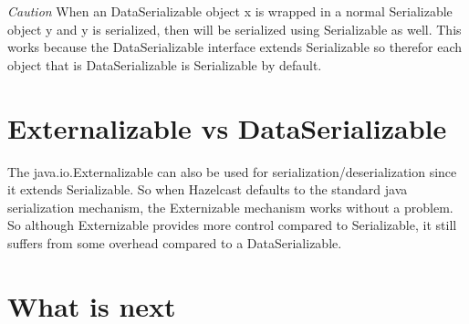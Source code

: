 \emph{Caution} When an DataSerializable object x is wrapped in a normal Serializable object y and y is serialized, then will be serialized using Serializable as well. This works because the DataSerializable interface extends Serializable so therefor each object that is DataSerializable is Serializable by default.

\section{Externalizable vs DataSerializable}
The java.io.Externalizable can also be used for serialization/deserialization since it extends Serializable. So when Hazelcast defaults to the standard java serialization mechanism, the Externizable mechanism works without a problem. So although Externizable provides more control compared to Serializable, it still suffers from some overhead compared to a DataSerializable.

\section{What is next}